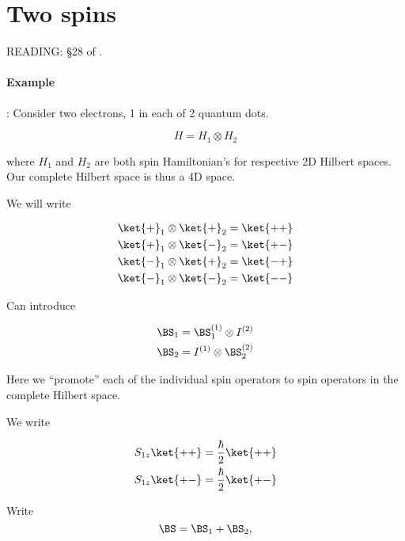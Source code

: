\section{Two spins}
\label{chap:qmTwoL16TwoSpin}

READING: \S 28 of \citep{desai2009quantum}.

\paragraph{Example}: Consider two electrons, 1 in each of 2 quantum dots.

\begin{equation}\label{eqn:qmTwoL16:190}
H = H_{1} \otimes H_{2}
\end{equation}

where $H_1$ and $H_2$ are both spin Hamiltonian's for respective 2D Hilbert spaces.  Our complete Hilbert space is thus a 4D space.

We will write

\begin{equation}\label{eqn:qmTwoL16:210}
\begin{aligned}
\ket{+}_1 \otimes \ket{+}_2 &= \ket{++} \\
\ket{+}_1 \otimes \ket{-}_2 &= \ket{+-} \\
\ket{-}_1 \otimes \ket{+}_2 &= \ket{-+} \\
\ket{-}_1 \otimes \ket{-}_2 &= \ket{--} 
\end{aligned}
\end{equation}

Can introduce

\begin{align}\label{eqn:qmTwoL16:230}
\BS_1 &= \BS_1^{(1)} \otimes I^{(2)} \\
\BS_2 &= I^{(1)} \otimes \BS_2^{(2)}
\end{align}

Here we ``promote'' each of the individual spin operators to spin operators in the complete Hilbert space.

We write

\begin{align}\label{eqn:qmTwoL16:250}
S_{1z}\ket{++} &= \frac{\hbar}{2} \ket{++} \\
S_{1z}\ket{+-} &= \frac{\hbar}{2} \ket{+-}
\end{align}

Write
\begin{equation}\label{eqn:qmTwoL16:270}
\BS = \BS_1 + \BS_2,
\end{equation}

